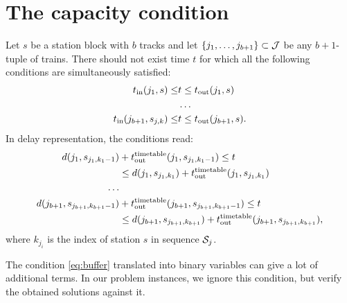 \section{The capacity condition}
Let $s$ be a station block with $b$ tracks and let $\{j_{1},\ldots,j_{b+1}\} \subset \mathcal{J}$ be any $b+1$-tuple of
trains. There should not exist time $t$ for which all the following conditions are simultaneously satisfied:
\begin{equation}
  \begin{split}
    t_\text{in}(j_{1}, s) \le &t \le t_\text{out}(j_{1}, s) \\
    &\ldots \\
    t_\text{in}(j_{b+1}, s_{j,k}) \le &t \le t_\text{out}(j_{b+1}, s).
  \end{split}
\end{equation}
In delay representation, the conditions read:
\begin{equation}
  \label{eq:buffer}
  \begin{split}
    d(j_{1}, s_{j_{1},k_{1}-1}) &+ t_\text{out}^\text{timetable}(j_{1},s_{j_{1},k_{1}-1}) \le t \\
                            &\le d(j_{1},s_{j_{1},k_{1}}) + t_\text{out}^\text{timetable}(j_{1},s_{j_{1},k_{1}})\\
    \ldots \\
    d(j_{b+1}, s_{j_{b+1},k_{b+1}-1}) &+ t_\text{out}^\text{timetable}(j_{b+1},s_{j_{b+1},k_{b+1}-1}) \le t \\
                            &\le d(j_{b+1},s_{j_{b+1},k_{b+1}}) + t_\text{out}^\text{timetable}(j_{b+1},s_{j_{b+1},k_{b+1}}),
  \end{split}
\end{equation}
where $k_{j_{i}}$ is the index of station $s$ in sequence $\mathcal{S}_j$.

The condition \eqref{eq:buffer} translated into binary variables can give a lot of additional terms.
In our problem instances, we ignore this condition, but verify the obtained solutions against it.
